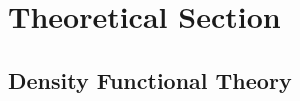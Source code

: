 \chapter{Theoretical Section}
\section{Density Functional Theory} \label{abs:grundlagen}
\begin{comment}
Modern DFT rests on two theorems by Hohenberg and Kohn (1964). The
first theorem states that the ground-state electron density
uniquely determines the electronic wavefunction and hence
all ground-state properties of an electronic system. The
second theorem establishes that the energy of an electron
distribution can be described as a functional of the electron
density, and this functional is a minimum for the groundstate
density. Thus, the problem of solving the many-body
Schro¨dinger equation is bypassed, and now the objective
becomes to minimize a density functional.
\end{comment}

